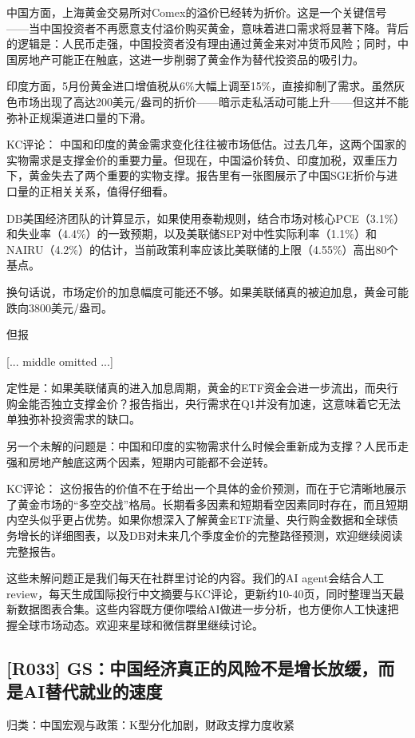 \documentclass[11pt]{ctexart}
\begin{document}
中国方面，上海黄金交易所对Comex的溢价已经转为折价。这是一个关键信号——当中国投资者不再愿意支付溢价购买黄金，意味着进口需求将显著下降。背后的逻辑是：人民币走强，中国投资者没有理由通过黄金来对冲货币风险；同时，中国房地产可能正在触底，这进一步削弱了黄金作为替代投资品的吸引力。

印度方面，5月份黄金进口增值税从6\%大幅上调至15\%，直接抑制了需求。虽然灰色市场出现了高达200美元/盎司的折价——暗示走私活动可能上升——但这并不能弥补正规渠道进口量的下滑。

KC评论： 中国和印度的黄金需求变化往往被市场低估。过去几年，这两个国家的实物需求是支撑金价的重要力量。但现在，中国溢价转负、印度加税，双重压力下，黄金失去了两个重要的实物支撑。报告里有一张图展示了中国SGE折价与进口量的正相关关系，值得仔细看。

DB美国经济团队的计算显示，如果使用泰勒规则，结合市场对核心PCE（3.1\%）和失业率（4.4\%）的一致预期，以及美联储SEP对中性实际利率（1.1\%）和NAIRU（4.2\%）的估计，当前政策利率应该比美联储的上限（4.55\%）高出80个基点。

换句话说，市场定价的加息幅度可能还不够。如果美联储真的被迫加息，黄金可能跌向3800美元/盎司。

但报

[... middle omitted ...]

定性是：如果美联储真的进入加息周期，黄金的ETF资金会进一步流出，而央行购金能否独立支撑金价？报告指出，央行需求在Q1并没有加速，这意味着它无法单独弥补投资需求的缺口。

另一个未解的问题是：中国和印度的实物需求什么时候会重新成为支撑？人民币走强和房地产触底这两个因素，短期内可能都不会逆转。

KC评论： 这份报告的价值不在于给出一个具体的金价预测，而在于它清晰地展示了黄金市场的“多空交战”格局。长期看多因素和短期看空因素同时存在，而且短期内空头似乎更占优势。如果你想深入了解黄金ETF流量、央行购金数据和全球债务增长的详细图表，以及DB对未来几个季度金价的完整路径预测，欢迎继续阅读完整报告。

这些未解问题正是我们每天在社群里讨论的内容。我们的AI agent会结合人工review，每天生成国际投行中文摘要与KC评论，更新约10-40页，同时整理当天最新数据图表合集。这些内容既方便你喂给AI做进一步分析，也方便你人工快速把握全球市场动态。欢迎来星球和微信群里继续讨论。

\subsection{[R033] GS：中国经济真正的风险不是增长放缓，而是AI替代就业的速度}
{\small\color{refgray}归类：中国宏观与政策：K型分化加剧，财政支撑力度收紧}
\end{document}
